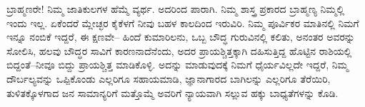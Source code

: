 \vskip 4pt

ಬ್ರಾಹ್ಮಣರೇ! ನಿಮ್ಮ ಜಾತಿಕುಲಗಳ ಹೆಮ್ಮೆ ವ್ಯರ್ಥ. ಅದರಿಂದ ಪಾರಾಗಿ. ನಿಮ್ಮ ಶಾಸ್ತ್ರ ಪ್ರಕಾರದ ಬ್ರಾಹ್ಮಣ್ಯ ನಿಮ್ಮಲ್ಲಿ ಇಂದು ಇಲ್ಲ. ಏಕೆಂದರೆ ಮ್ಲೇಚ್ಛರ ಕೈಕೆಳಗೆ ನೀವು ಬಹಳ ಕಾಲದಿಂದ ಇರುವಿರಿ. ನಿಮ್ಮ ಪೂರ್ವಿಕರ ಮಾತಿನಲ್ಲಿ ನಿಮಗೆ ಇನ್ನೂ ನಂಬಿಕೆ ಇದ್ದರೆ, ಈ ಕ್ಷಣವೇ– ಹಿಂದೆ ಕುಮಾರಿಲನು, ಒಬ್ಬ ಬೌದ್ಧ ಗುರುವಿನಲ್ಲಿ ಕಲಿತು, ಅನಂತರ ಅವರನ್ನು ಸೋಲಿಸಿ, ಹಲವು ಬೌದ್ಧರ ಸಾವಿಗೆ ಕಾರಣನಾದೆನೆಂದು, ಅದರ ಪ್ರಾಯಶ್ಚಿತ್ತಕ್ಕಾಗಿ ದಹಿಸುತ್ತಿದ್ದ ಹೊಟ್ಟಿನ ರಾಶಿಯಲ್ಲಿ ಬಿದ್ದಂತೆ–ನೀವೂ ಬಿದ್ದು ಪ್ರಾಯಶ್ಚಿತ್ತ ಮಾಡಿಕೊಳ್ಳಿ. ಅದನ್ನು ಮಾಡುವುದಕ್ಕೆ ನಿಮಗೆ ಧೈರ್ಯವಿಲ್ಲದೇ ಇದ್ದರೆ, ನಿಮ್ಮ ದೌರ್ಬಲ್ಯವನ್ನು ಒಪ್ಪಿಕೊಂಡು ಎಲ್ಲರಿಗೂ ಸಹಾಯಮಾಡಿ, ಜ್ಞಾನಾಗಾರದ ಬಾಗಿಲನ್ನು ಎಲ್ಲರಿಗೂ ತೆರೆಯಿರಿ, ತುಳಿತಕ್ಕೊಳಗಾದ ಜನ ಸಾಮಾನ್ಯರಿಗೆ ಮತ್ತೊಮ್ಮೆ ಅವರಿಗೆ ನ್ಯಾಯವಾಗಿ ಸಲ್ಲುವ ಹಕ್ಕು ಬಾಧ್ಯತೆಗಳನ್ನು ಕೊಡಿ.

